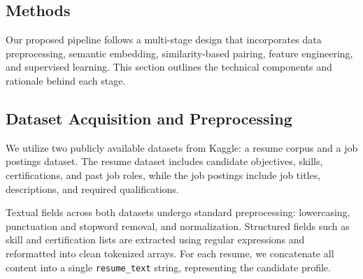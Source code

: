 \documentclass[a4paper]{article}
\begin{document}
\begin{multicols}{2}



\section{Methods}
Our proposed pipeline follows a multi-stage design that incorporates data preprocessing, semantic embedding, similarity-based pairing, feature engineering, and supervised learning. This section outlines the technical components and rationale behind each stage.

\subsection{Dataset Acquisition and Preprocessing}
We utilize two publicly available datasets from Kaggle: a resume corpus and a job postings dataset. The resume dataset includes candidate objectives, skills, certifications, and past job roles, while the job postings include job titles, descriptions, and required qualifications.

Textual fields across both datasets undergo standard preprocessing: lowercasing, punctuation and stopword removal, and normalization. Structured fields such as skill and certification lists are extracted using regular expressions and reformatted into clean tokenized arrays. For each resume, we concatenate all content into a single \texttt{resume\_text} string, representing the candidate profile.


\end{multicols}
\end{document}
